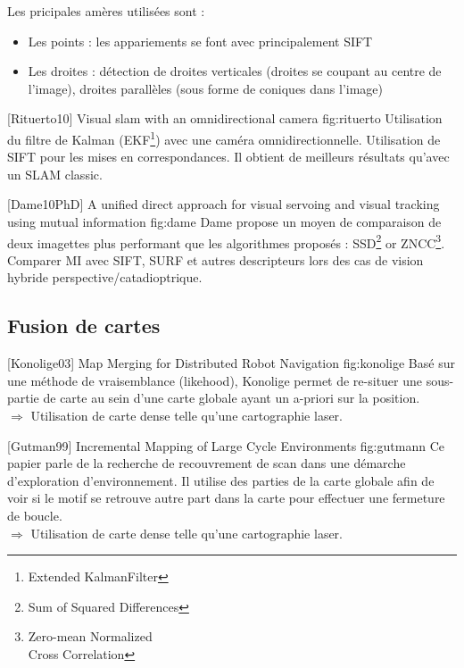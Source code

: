   
    Les pricipales amères utilisées sont :
    \begin{itemize}
    \item Les points : les appariements se font avec principalement SIFT
    \item Les droites : détection de droites verticales (droites se coupant au centre de l'image), droites parallèles (sous forme de coniques dans l'image)
    \end{itemize}
    
    
    
    {[Rituerto10] Visual slam with an omnidirectional camera} {fig:rituerto}
        Utilisation du filtre de Kalman (EKF\footnote{Extended KalmanFilter}) avec une caméra omnidirectionnelle. Utilisation de SIFT pour les mises en correspondances. Il obtient de meilleurs résultats qu'avec un SLAM classic. 
  
  
  
        {[Dame10PhD] A unified direct approach for visual servoing and visual tracking using mutual information} {fig:dame}
        Dame propose un moyen de comparaison de deux imagettes plus performant que les algorithmes proposés : SSD\footnote{Sum of Squared Differences} or ZNCC\footnote{Zero-mean Normalized\\Cross Correlation}.
    Comparer MI avec SIFT, SURF et autres descripteurs lors des cas de vision hybride perspective/catadioptrique.  
  
\subsection{Fusion de cartes}

        {[Konolige03] Map Merging for Distributed Robot Navigation}
      {fig:konolige}
        Basé sur une méthode de vraisemblance (likehood), Konolige permet de re-situer une sous-partie de carte au sein d'une carte globale ayant un a-priori sur la position.\\
        $\Rightarrow$ Utilisation de carte dense telle qu'une cartographie laser.




        {[Gutman99] Incremental Mapping of Large Cycle Environments}
      {fig:gutmann}
        Ce papier parle de la recherche de recouvrement de scan dans une démarche d'exploration d'environnement. 
        Il utilise des parties de la carte globale afin de voir si le motif se retrouve autre part dans la carte pour effectuer une fermeture de boucle.\\
        $\Rightarrow$ Utilisation de carte dense telle qu'une cartographie laser.
        
